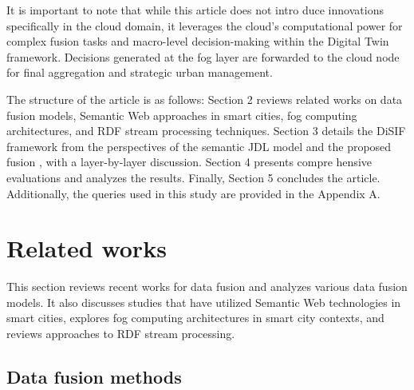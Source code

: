 \documentclass[5p,times]{elsarticle}
\begin{document}
 It is important to note that while this article does not intro
 duce innovations specifically in the cloud domain, it leverages
  the cloud’s computational power for complex fusion tasks and
  macro-level decision-making within the Digital Twin framework.
  Decisions generated at the fog layer are forwarded to the cloud
  node for final aggregation and strategic urban management.


  The structure of the article is as follows: Section 2 reviews related
 works on data fusion models, Semantic Web approaches in smart
 cities, fog computing architectures, and RDF stream processing
 techniques. Section 3 details the DiSIF framework from the
 perspectives of the semantic JDL model and the proposed fusion
 , with a layer-by-layer discussion. Section 4 presents compre
hensive evaluations and analyzes the results. Finally, Section 5
 concludes the article. Additionally, the queries used in this study
 are provided in the Appendix A.




\section{Related works}
This section reviews recent works for data fusion and analyzes various data fusion models. It also discusses studies that have utilized Semantic Web technologies in smart cities, explores fog computing architectures in smart city contexts, and reviews approaches to RDF stream processing.


\subsection{Data fusion methods}
\end{document}

